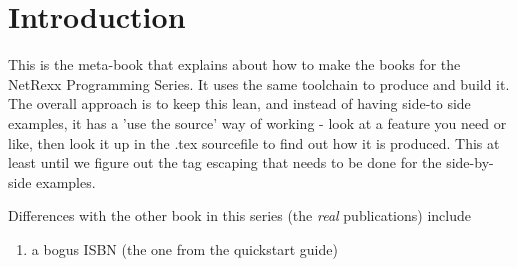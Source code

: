 \chapter{Introduction}
This is the meta-book that explains about how to make the books for
the NetRexx Programming Series. It uses the same toolchain to
produce and build it. The overall approach is to keep this lean, and
instead of having side-to side examples, it has a 'use the source' way
of working - look at a feature you need or like, then look it up in
the .tex sourcefile to find out how it is produced. This at least
until we figure out the tag escaping that needs to be done for the
side-by-side examples.

Differences with the other book in this series (the \emph{real}
publications) include
\begin{enumerate}
\item a bogus ISBN (the one from the quickstart guide)
\end{enumerate}